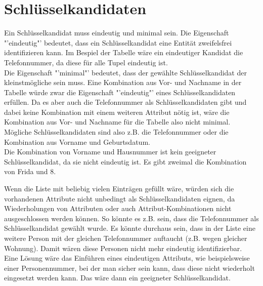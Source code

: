 \documentclass[ngerman]{gdb-aufgabenblatt}
\begin{document}
\section{Schl\"usselkandidaten}
\begin{compactenum}[(a)]
	\item Ein Schl\"usselkandidat muss eindeutig und minimal sein. Die Eigenschaft "'eindeutig"' bedeutet, dass ein Schl\"usselkandidat eine Entit\"at zweifelsfrei identifizieren kann. Im Bespiel der Tabelle w\"are ein eindeutiger Kandidat die Telefonnummer, da diese f\"ur alle Tupel eindeutig ist. \\
	Die Eigenschaft "'minimal"' bedeutet, dass der gew\"ahlte Schl\"usselkandidat der kleinstm\"ogliche sein muss. Eine Kombination aus Vor- und Nachname in der Tabelle w\"urde zwar die Eigenschaft "'eindeutig"' eines Schl\"usselkandidaten erf\"ullen. Da es aber auch die Telefonnummer als Schl\"usselkandidaten gibt und dabei keine Kombination mit einem weiteren Attribut n\"otig ist, w\"are die Kombination aus Vor- und Nachname f\"ur die Tabelle also nicht minimal. \\
	M\"ogliche Schl\"usselkandidaten sind also z.B. die Telefonnummer oder die Kombination aus Vorname und Geburtsdatum. \\
	Die Kombination von Vorname und Hausnummer ist kein geeigneter Schl\"usselkandidat, da sie nicht eindeutig ist. Es gibt zweimal die Kombination von Frida und 8. \\
	\item Wenn die Liste mit beliebig vielen Eintr\"agen gef\"ullt w\"are, w\"urden sich die vorhandenen Attribute nicht unbedingt als Schl\"usselkandidaten eignen, da Wiederholungen von Attributen oder auch Attribut-Kombinationen nicht ausgeschlossen werden k\"onnen. So k\"onnte es z.B. sein, dass die Telefonnummer als Schl\"usselkandidat gew\"ahlt wurde. Es k\"onnte durchaus sein, dass in der Liste eine weitere Person mit der gleichen Telefonnummer auftaucht (z.B. wegen gleicher Wohnung). Damit w\"aren diese Personen nicht mehr eindeutig identifizierbar.\\
	Eine L\"osung w\"are das Einf\"uhren eines eindeutigen Attributs, wie beispielsweise einer Personennummer, bei der man sicher sein kann, dass diese nicht wiederholt eingesetzt werden kann. Das w\"are dann ein geeigneter Schl\"usselkandidat.
\end{compactenum}
\end{document}
